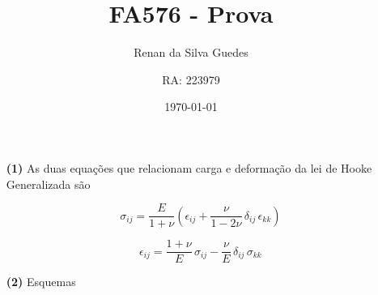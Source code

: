 \documentclass[a4paper, 12pt, brazilian]{article}
\title{FA576 - Prova}
\author{Renan da Silva Guedes \and RA: 223979}
\date{\today}
\begin{document}
	\maketitle
	\begin{itemize}
		\item[\textbf{(1)}] As duas equações que relacionam carga e deformação da lei de Hooke Generalizada são
		
		\begin{equation}
			\sigma_{ij}=\dfrac{E}{1+\nu}\left(\epsilon_{ij}+\dfrac{\nu}{1-2\nu}\,\delta_{ij}\,\epsilon_{kk}\right)
		\end{equation}
		
		\begin{equation}
			\epsilon_{ij}=\dfrac{1+\nu}{E}\,\sigma_{ij}-\dfrac{\nu}{E}\,\delta_{ij}\,\sigma_{kk}
		\end{equation}
		
		\item[\textbf{(2)}] Esquemas
		

\end{itemize}
\end{document}
